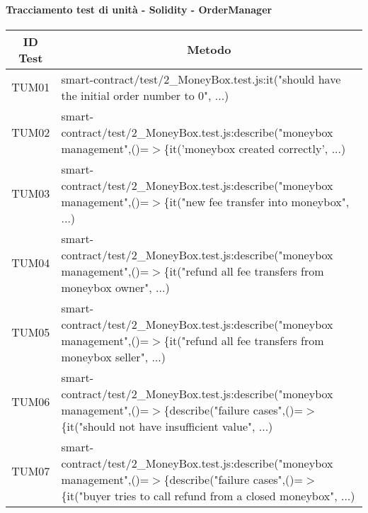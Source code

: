 \paragraph{Tracciamento test di unità - Solidity - OrderManager}\label{paragraph:tracciamento_TUM}

\begin{table}[H]
  \centering
  \renewcommand{\arraystretch}{1.8}
  \begin{tabular}{c|p{15cm}}
    \rowcolor[HTML]{125E28}
    \color[HTML]{FFFFFF}\textbf{ID Test}
         & \multicolumn{1}{c}{\color[HTML]{FFFFFF}\textbf{Metodo}}                                                                                       \\
    \hline
    TUM01 & smart-contract/test/2\_MoneyBox.test.js:it("should have the initial order number to 0", ...)                                                                                      \\
    TUM02 & smart-contract/test/2\_MoneyBox.test.js:describe("moneybox management",\newline()=$>$\{it('moneybox created correctly', ...)                                                         \\
    TUM03 & smart-contract/test/2\_MoneyBox.test.js:describe("moneybox management",\newline()=$>$\{it("new fee transfer into moneybox", ...)              \\
    TUM04 & smart-contract/test/2\_MoneyBox.test.js:describe("moneybox management",\newline()=$>$\{it("refund all fee transfers from moneybox owner", ...)                                   \\
    TUM05 & smart-contract/test/2\_MoneyBox.test.js:describe("moneybox management",\newline()=$>$\{it("refund all fee transfers from moneybox seller", ...)                                 \\
    TUM06 & smart-contract/test/2\_MoneyBox.test.js:describe("moneybox management",\newline()=$>$\{describe("failure cases",()=$>$\{it("should not have insufficient value", ...)                                   \\
    TUM07 & smart-contract/test/2\_MoneyBox.test.js:describe("moneybox management",\newline()=$>$\{describe("failure cases",()=$>$\{it("buyer tries to call refund from a closed moneybox", ...)                                         \\

\end{tabular}
\end{table}
